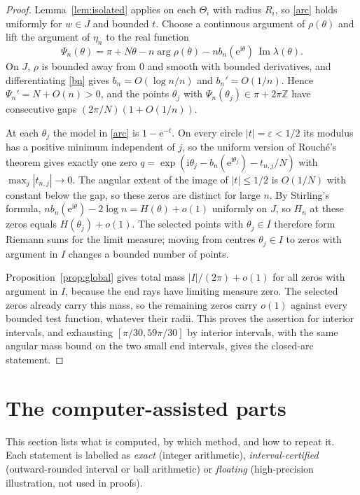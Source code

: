\documentclass[11pt,a4paper]{article}
\theoremstyle{remark}
\newcommand{\e}{\mathrm e}
\newcommand{\ii}{\mathrm i}
\newcommand{\Ima}{\operatorname{Im}}
\begin{document}
\begin{proof}
Lemma~\ref{lem:isolated} applies on each $\Theta_i$ with radius $R_i$, so \eqref{arc} holds uniformly for $w\in J$ and bounded $t$. Choose a continuous argument of $\rho(\theta)$ and lift the argument of $\eta_n$ to the real function
\[
\Psi_n(\theta)=\pi+N\theta-n\arg\rho(\theta)-nb_n(\e^{\ii\theta})\,\Ima\lambda(\theta).
\]
On $J$, $\rho$ is bounded away from $0$ and smooth with bounded derivatives, and differentiating \eqref{bn} gives $b_n=O(\log n/n)$ and $b_n'=O(1/n)$. Hence $\Psi_n'=N+O(n)>0$, and the points $\theta_j$ with $\Psi_n(\theta_j)\in\pi+2\pi\mathbb Z$ have consecutive gaps $(2\pi/N)(1+O(1/n))$.

At each $\theta_j$ the model in \eqref{arc} is $1-\e^{-t}$. On every circle $|t|=\varepsilon<1/2$ its modulus has a positive minimum independent of $j$, so the uniform version of Rouch\'e's theorem gives exactly one zero $q=\exp(\ii\theta_j-b_n(\e^{\ii\theta_j})-t_{n,j}/N)$ with $\max_j|t_{n,j}|\to0$. The angular extent of the image of $|t|\le1/2$ is $O(1/N)$ with constant below the gap, so these zeros are distinct for large $n$. By Stirling's formula, $nb_n(\e^{\ii\theta})-2\log n=H(\theta)+o(1)$ uniformly on $J$, so $H_n$ at these zeros equals $H(\theta_j)+o(1)$. The selected points with $\theta_j\in I$ therefore form Riemann sums for the limit measure; moving from centres $\theta_j\in I$ to zeros with argument in $I$ changes a bounded number of points.

Proposition~\ref{prop:global} gives total mass $|I|/(2\pi)+o(1)$ for all zeros with argument in $I$, because the end rays have limiting measure zero. The selected zeros already carry this mass, so the remaining zeros carry $o(1)$ against every bounded test function, whatever their radii. This proves the assertion for interior intervals, and exhausting $[\pi/30,59\pi/30]$ by interior intervals, with the same angular mass bound on the two small end intervals, gives the closed-arc statement.
\end{proof}

\section{The computer-assisted parts}\label{sec:certificates}
This section lists what is computed, by which method, and how to repeat it. Each statement is labelled as \emph{exact} (integer arithmetic), \emph{interval-certified} (outward-rounded interval or ball arithmetic) or \emph{floating} (high-precision illustration, not used in proofs).
\end{document}
